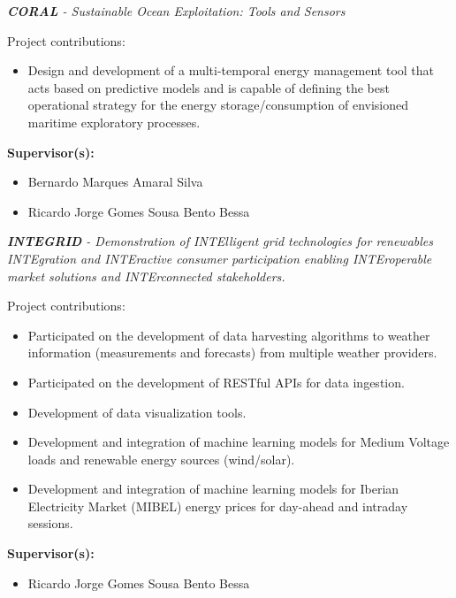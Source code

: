 \documentclass{mycv}
\begin{document}
\begin{myitemize}
	\item \textit{\textbf{CORAL} - Sustainable Ocean Exploitation: Tools and Sensors}
	\vspace{0.2cm}
	
	Project contributions:
	\begin{itemize}[itemsep=1px]

	\item Design and development of a multi-temporal energy management tool that acts based on predictive models and is capable of defining the best operational strategy for the energy storage/consumption of envisioned maritime exploratory processes.
	\end{itemize}
	\vspace{0.2cm}
	
	\textbf{Supervisor(s):}
	\begin{itemize}
		\item Bernardo Marques Amaral Silva
		\item Ricardo Jorge Gomes Sousa Bento Bessa
	\end{itemize}
		
	\vspace{0.4cm}
	
	\item \textit{\textbf{INTEGRID} - Demonstration of INTElligent grid technologies for renewables INTEgration and INTEractive consumer participation enabling INTEroperable market solutions and INTErconnected stakeholders.}
	\vspace{0.2cm}
	
	Project contributions:
	\begin{itemize}[itemsep=1px]
	\item Participated on the development of data harvesting algorithms to weather information (measurements and forecasts) from multiple weather providers.
	\item Participated on the development of RESTful APIs for data ingestion.
	\item Development of data visualization tools.
	\item Development and integration of machine learning models for Medium Voltage loads and renewable energy sources (wind/solar).
	\item Development and integration of machine learning models for Iberian Electricity Market (MIBEL) energy prices for day-ahead and intraday sessions.
	\end{itemize}	
	
	\vspace{0.2cm}
	
	\textbf{Supervisor(s):}
	\begin{itemize}
		\item Ricardo Jorge Gomes Sousa Bento Bessa
	\end{itemize}
		
\end{myitemize}
\end{document}
